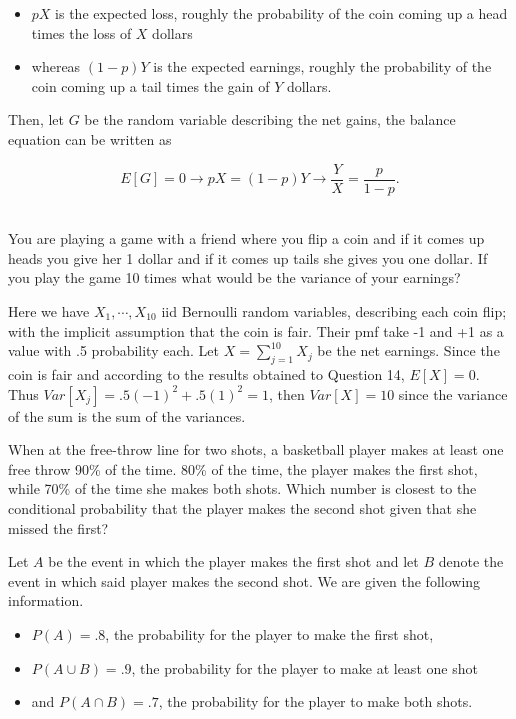 \documentclass{homework}
\begin{document}
\begin{itemize}
    \item $pX$ is the expected loss, roughly the probability of the coin coming up a head times the loss of $X$ dollars
    \item whereas $(1-p)Y$ is the expected earnings, roughly the probability of the coin coming up a tail times the gain of $Y$ dollars.
\end{itemize}

Then, let $G$ be the random variable describing the net gains, the balance equation can be written as

$$ E[G] = 0 \longrightarrow
pX = (1-p)Y \longrightarrow \frac{Y}{X} = \frac{p}{1-p}.
$$\\

\begin{tcolorbox}[title=Question 14]
You are playing a game with a friend where you flip a coin and if it comes up heads you give her 1 dollar and if it comes up tails she gives you one dollar.  If you play the game 10 times what would be the variance of your earnings?
\end{tcolorbox}

Here we have $X_{1},\cdots,X_{10}$ iid Bernoulli random variables, describing each coin flip; with the implicit assumption that the coin is fair. Their pmf take -1 and +1 as a value with .5 probability each. Let $X = \sum_{j=1}^{10} X_j$ be the net earnings. Since the coin is fair and according to the results obtained to Question 14, $E[X] =0$. Thus $Var[X_j] = .5(-1)^2+.5(1)^2=1$, then $Var[X]=10$ since the variance of the sum is the sum of the variances. \\

\begin{tcolorbox}[title=Question 15]
When at the free-throw line for two shots, a basketball player makes at least one free throw 90\% of the time. 80\% of the time, the player makes the first shot, while 70\% of the time she makes both shots. Which number is closest to the conditional probability that the player makes the second shot given that she missed the first?
\end{tcolorbox}

Let $A$ be the event in which the player makes the first shot and let $B$ denote the event in which said player makes the second shot. We are given the following information.

\begin{itemize}
    \item $P(A) = .8$, the probability for the player to make the first shot,
    \item $P(A \cup B) = .9$, the probability for the player to make at least one shot
    \item and $P(A \cap B) = .7$, the probability for the player to make both shots.
\end{itemize}
\end{document}
